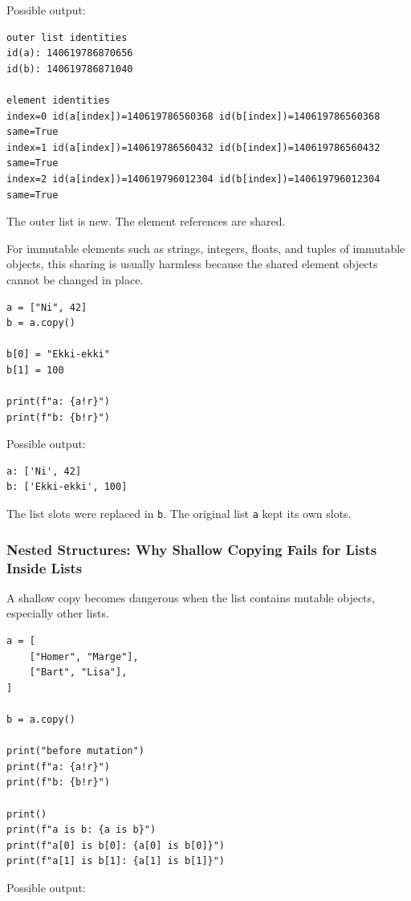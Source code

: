 Possible output:

\begin{verbatim}
outer list identities
id(a): 140619786870656
id(b): 140619786871040

element identities
index=0 id(a[index])=140619786560368 id(b[index])=140619786560368 same=True
index=1 id(a[index])=140619786560432 id(b[index])=140619786560432 same=True
index=2 id(a[index])=140619796012304 id(b[index])=140619796012304 same=True
\end{verbatim}

The outer list is new. The element references are shared.

For immutable elements such as strings, integers, floats, and tuples of immutable objects, this sharing is usually harmless because the shared element objects cannot be changed in place.

\begin{verbatim}
a = ["Ni", 42]
b = a.copy()

b[0] = "Ekki-ekki"
b[1] = 100

print(f"a: {a!r}")
print(f"b: {b!r}")
\end{verbatim}

Possible output:

\begin{verbatim}
a: ['Ni', 42]
b: ['Ekki-ekki', 100]
\end{verbatim}

The list slots were replaced in \texttt{b}. The original list \texttt{a} kept its own slots.

\subsubsection{Nested Structures: Why Shallow Copying Fails for Lists Inside Lists}

A shallow copy becomes dangerous when the list contains mutable objects, especially other lists.

\begin{verbatim}
a = [
    ["Homer", "Marge"],
    ["Bart", "Lisa"],
]

b = a.copy()

print("before mutation")
print(f"a: {a!r}")
print(f"b: {b!r}")

print()
print(f"a is b: {a is b}")
print(f"a[0] is b[0]: {a[0] is b[0]}")
print(f"a[1] is b[1]: {a[1] is b[1]}")
\end{verbatim}

Possible output:

